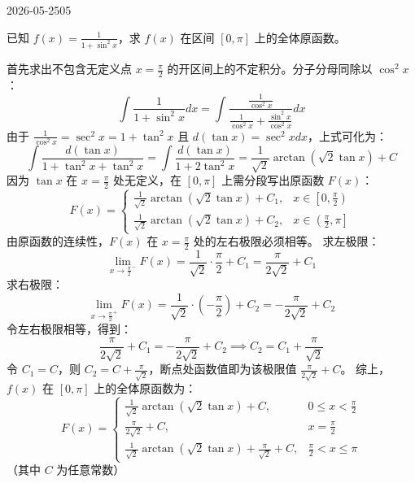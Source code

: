 \begin{mistake}{2026-05-25}{05}

\begin{problemcontent}
已知 \(f(x) = \frac{1}{1+\sin^2 x}\)，求 \(f(x)\) 在区间 \([0, \pi]\) 上的全体原函数。
\end{problemcontent}

\begin{solutioncontent}
首先求出不包含无定义点 \(x = \frac{\pi}{2}\) 的开区间上的不定积分。分子分母同除以 \(\cos^2 x\)：
\[
\int \frac{1}{1+\sin^2 x} dx = \int \frac{\frac{1}{\cos^2 x}}{\frac{1}{\cos^2 x} + \frac{\sin^2 x}{\cos^2 x}} dx
\]
由于 \(\frac{1}{\cos^2 x} = \sec^2 x = 1+\tan^2 x\) 且 \(d(\tan x) = \sec^2 x dx\)，上式可化为：
\[
\int \frac{d(\tan x)}{1+\tan^2 x + \tan^2 x} = \int \frac{d(\tan x)}{1+2\tan^2 x} = \frac{1}{\sqrt{2}}\arctan(\sqrt{2}\tan x) + C
\]
因为 \(\tan x\) 在 \(x = \frac{\pi}{2}\) 处无定义，在 \([0, \pi]\) 上需分段写出原函数 \(F(x)\)：
\[
F(x) = \begin{cases}
\frac{1}{\sqrt{2}}\arctan(\sqrt{2}\tan x) + C_1, & x \in \left[0, \frac{\pi}{2}\right) \\
\frac{1}{\sqrt{2}}\arctan(\sqrt{2}\tan x) + C_2, & x \in \left(\frac{\pi}{2}, \pi\right]
\end{cases}
\]
由原函数的连续性，\(F(x)\) 在 \(x = \frac{\pi}{2}\) 处的左右极限必须相等。
求左极限：
\[
\lim_{x \to \frac{\pi}{2}^-} F(x) = \frac{1}{\sqrt{2}} \cdot \frac{\pi}{2} + C_1 = \frac{\pi}{2\sqrt{2}} + C_1
\]
求右极限：
\[
\lim_{x \to \frac{\pi}{2}^+} F(x) = \frac{1}{\sqrt{2}} \cdot \left(-\frac{\pi}{2}\right) + C_2 = -\frac{\pi}{2\sqrt{2}} + C_2
\]
令左右极限相等，得到：
\[
\frac{\pi}{2\sqrt{2}} + C_1 = -\frac{\pi}{2\sqrt{2}} + C_2 \implies C_2 = C_1 + \frac{\pi}{\sqrt{2}}
\]
令 \(C_1 = C\)，则 \(C_2 = C + \frac{\pi}{\sqrt{2}}\)，断点处函数值即为该极限值 \(\frac{\pi}{2\sqrt{2}} + C\)。
综上，\(f(x)\) 在 \([0, \pi]\) 上的全体原函数为：
\[
F(x) = \begin{cases} 
\frac{1}{\sqrt{2}}\arctan(\sqrt{2}\tan x) + C, & 0 \le x < \frac{\pi}{2} \\ 
\frac{\pi}{2\sqrt{2}} + C, & x = \frac{\pi}{2} \\ 
\frac{1}{\sqrt{2}}\arctan(\sqrt{2}\tan x) + \frac{\pi}{\sqrt{2}} + C, & \frac{\pi}{2} < x \le \pi 
\end{cases}
\]
（其中 \(C\) 为任意常数）
\end{solutioncontent}


\end{mistake}
